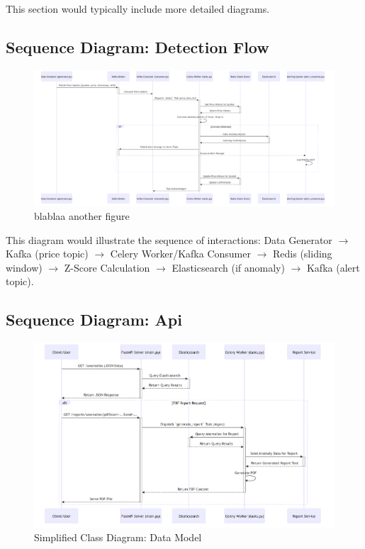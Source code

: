 This section would typically include more detailed diagrams.

\subsection{Sequence Diagram: Detection Flow}

\begin{figure}
\centering

\centering


\includegraphics[width=\textwidth]{figures/backend-1.png}

\caption{blablaa another figure}

\label{fig:Expdiagram1}
\end{figure}


This diagram would illustrate the sequence of interactions: Data Generator $\rightarrow$ Kafka (price topic) $\rightarrow$ Celery Worker/Kafka Consumer $\rightarrow$ Redis (sliding window) $\rightarrow$ Z-Score Calculation $\rightarrow$ Elasticsearch (if anomaly) $\rightarrow$ Kafka (alert topic).

\break

\subsection{Sequence Diagram: Api }

\begin{figure}[H]
    \centering
    \includegraphics[width=1.2\textwidth,angle=90]{figures/api-1.png}
    \caption{Simplified Class Diagram: Data Model}
    \label{fig:class_diagram_data_model}
\end{figure}

